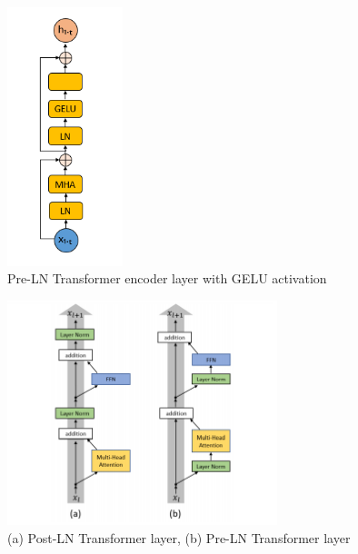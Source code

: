\begin{figure}
	\centering
	\includegraphics[width=0.3\textwidth]{figures/ml_theory/transformer_block.png}
	\caption{Pre-LN Transformer encoder layer with GELU activation}
	\label{fig:pre_trsf}
\end{figure}

\begin{figure}
	\centering
	\includegraphics[width=0.7\textwidth]{figures/ml_theory/post_pre_trsf.png}
	\caption{(a) Post-LN Transformer layer, (b) Pre-LN Transformer
		layer~\cite{xiong_layer_2020}}
	\label{fig:post_pre_trsf}
\end{figure}
